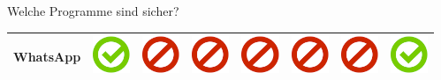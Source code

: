 \documentclass[final]{beamer}
\newlength{\sepwid}
\newlength{\twocolwid}
\begin{document}
\begin{frame}[t]
\begin{columns}[t, totalwidth=\textwidth]
\begin{column}{\twocolwid}
\begin{block}{Welche Programme sind sicher?}
\begin{tabular}{ l | C{4cm} | C{4.5cm} | C{4cm} | C{4.5cm} | C{4cm} | C{5cm} | C{3cm} | }
WhatsApp & \includegraphics[scale=0.5]{pics/haken.png} & \includegraphics[scale=0.5]{pics/nohaken.png} & \includegraphics[scale=0.5]{pics/nohaken.png} & \includegraphics[scale=0.5]{pics/nohaken.png} & \includegraphics[scale=0.5]{pics/nohaken.png} & \includegraphics[scale=0.5]{pics/nohaken.png} & \includegraphics[scale=0.5]{pics/haken.png} \tabularnewline
\hline
\end{tabular}

\end{block}

\end{column} %

\begin{column}{\sepwid}\end{column} %


\end{columns}
\end{frame}
\end{document}
